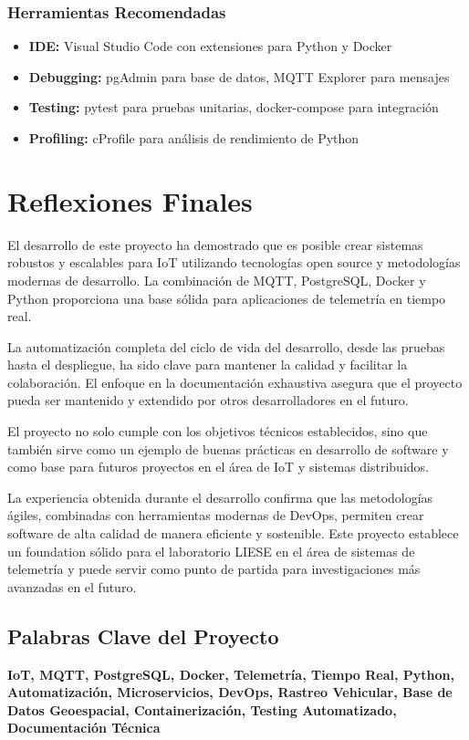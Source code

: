 \subsubsection{Herramientas Recomendadas}
\begin{itemize}
    \item \textbf{IDE:} Visual Studio Code con extensiones para Python y Docker
    \item \textbf{Debugging:} pgAdmin para base de datos, MQTT Explorer para mensajes
    \item \textbf{Testing:} pytest para pruebas unitarias, docker-compose para integración
    \item \textbf{Profiling:} cProfile para análisis de rendimiento de Python
\end{itemize}

\section{Reflexiones Finales}

El desarrollo de este proyecto ha demostrado que es posible crear sistemas robustos y escalables para IoT utilizando tecnologías open source y metodologías modernas de desarrollo. La combinación de MQTT, PostgreSQL, Docker y Python proporciona una base sólida para aplicaciones de telemetría en tiempo real.

La automatización completa del ciclo de vida del desarrollo, desde las pruebas hasta el despliegue, ha sido clave para mantener la calidad y facilitar la colaboración. El enfoque en la documentación exhaustiva asegura que el proyecto pueda ser mantenido y extendido por otros desarrolladores en el futuro.

El proyecto no solo cumple con los objetivos técnicos establecidos, sino que también sirve como un ejemplo de buenas prácticas en desarrollo de software y como base para futuros proyectos en el área de IoT y sistemas distribuidos.

La experiencia obtenida durante el desarrollo confirma que las metodologías ágiles, combinadas con herramientas modernas de DevOps, permiten crear software de alta calidad de manera eficiente y sostenible. Este proyecto establece un foundation sólido para el laboratorio LIESE en el área de sistemas de telemetría y puede servir como punto de partida para investigaciones más avanzadas en el futuro.

\subsection{Palabras Clave del Proyecto}

\textbf{IoT, MQTT, PostgreSQL, Docker, Telemetría, Tiempo Real, Python, Automatización, Microservicios, DevOps, Rastreo Vehicular, Base de Datos Geoespacial, Containerización, Testing Automatizado, Documentación Técnica}
